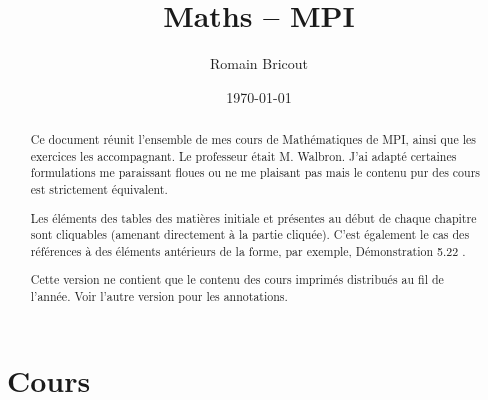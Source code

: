 \documentclass[a4paper,12pt]{report}
\title{Maths -- MPI}
\author{Romain Bricout}
\date{\today}
\newcommand{\ds}{\displaystyle}
\theoremstyle{break}
\theoremstyle{break}
\theoremstyle{break}
\theoremstyle{break}
\theoremstyle{break}
\theoremstyle{break}
\theoremstyle{break}
\theoremstyle{break}
\theoremstyle{break}
\theoremstyle{break}
\theoremstyle{break}
\theoremstyle{break}
\theoremstyle{break}
\theoremstyle{break}
\theoremstyle{break}
\theoremstyle{break}
\theoremstyle{break}
\theoremstyle{break}
\theoremstyle{break}
\theoremstyle{break}
\theoremstyle{break}
\theoremstyle{break}
\theoremstyle{break}
\theoremstyle{break}
\theoremstyle{break}
\theoremstyle{break}
\theoremstyle{break}
\theoremstyle{break}
\theoremstyle{break}
\theoremstyle{break}
\newcommand{\guillemets}[1]{\og #1 \fg{}}
\begin{document}
\renewcommand{\labelitemi}{\(\triangleright\)}
\renewcommand{\labelenumi}{(\arabic{enumi})}

\everymath{\ds}

\maketitle

\begin{abstract}
Ce document réunit l'ensemble de mes cours de Mathématiques de MPI, ainsi que les exercices les accompagnant. Le professeur était M. Walbron. J'ai adapté certaines formulations me paraissant floues ou ne me plaisant pas mais le contenu pur des cours est strictement équivalent.

Les éléments des tables des matières initiale et présentes au début de chaque chapitre sont cliquables (amenant directement à la partie cliquée). C'est également le cas des références à des éléments antérieurs de la forme, par exemple, \guillemets{Démonstration 5.22}.

Cette version ne contient que le contenu des cours imprimés distribués au fil de l'année. Voir l'autre version pour les annotations.
\end{abstract}

\dominitoc\tableofcontents

\part{Cours}


















\end{document}
